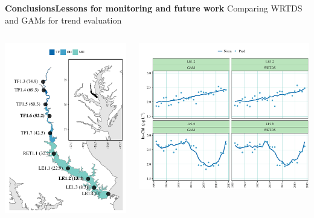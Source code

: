 \documentclass[serif]{beamer}\usepackage[]{graphicx}\usepackage[]{color}
\begin{document}
\begin{frame}{\textbf{Conclusions}}{\textbf{Lessons for monitoring and future work}}
Comparing WRTDS and GAMs for trend evaluation
\begin{columns}
\begin{column}{0.38\textwidth}
\includegraphics[width = \textwidth]{fig/patux_map.pdf}
\end{column}
\begin{column}{0.65\textwidth}
\includegraphics[width = \textwidth]{fig/predann.pdf}

\end{column}
\end{columns}
\end{frame}
\end{document}
